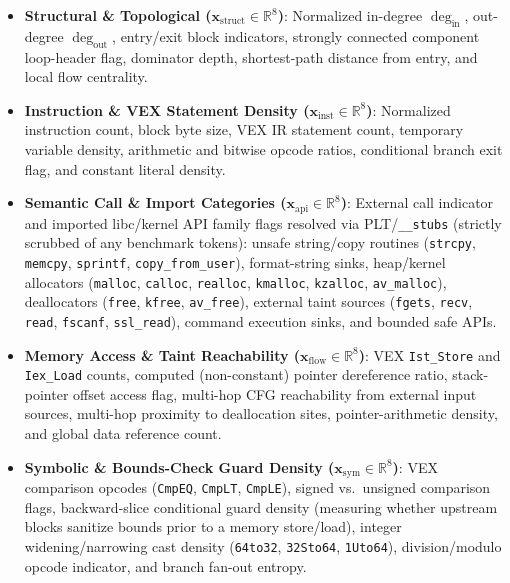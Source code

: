 \documentclass[10pt,conference]{IEEEtran}
\begin{document}
\begin{itemize}
  \item \textbf{Structural \& Topological ($\mathbf{x}_{\text{struct}} \in \mathbb{R}^8$)}: Normalized in-degree $\deg_{\text{in}}$, out-degree $\deg_{\text{out}}$, entry/exit block indicators, strongly connected component loop-header flag, dominator depth, shortest-path distance from entry, and local flow centrality.
  \item \textbf{Instruction \& VEX Statement Density ($\mathbf{x}_{\text{inst}} \in \mathbb{R}^8$)}: Normalized instruction count, block byte size, VEX IR statement count, temporary variable density, arithmetic and bitwise opcode ratios, conditional branch exit flag, and constant literal density.
  \item \textbf{Semantic Call \& Import Categories ($\mathbf{x}_{\text{api}} \in \mathbb{R}^8$)}: External call indicator and imported libc/kernel API family flags resolved via PLT/\texttt{\_\_stubs} (strictly scrubbed of any benchmark tokens): unsafe string/copy routines (\texttt{strcpy}, \texttt{memcpy}, \texttt{sprintf}, \texttt{copy\_from\_user}), format-string sinks, heap/kernel allocators (\texttt{malloc}, \texttt{calloc}, \texttt{realloc}, \texttt{kmalloc}, \texttt{kzalloc}, \texttt{av\_malloc}), deallocators (\texttt{free}, \texttt{kfree}, \texttt{av\_free}), external taint sources (\texttt{fgets}, \texttt{recv}, \texttt{read}, \texttt{fscanf}, \texttt{ssl\_read}), command execution sinks, and bounded safe APIs.
  \item \textbf{Memory Access \& Taint Reachability ($\mathbf{x}_{\text{flow}} \in \mathbb{R}^8$)}: VEX \texttt{Ist\_Store} and \texttt{Iex\_Load} counts, computed (non-constant) pointer dereference ratio, stack-pointer offset access flag, multi-hop CFG reachability from external input sources, multi-hop proximity to deallocation sites, pointer-arithmetic density, and global data reference count.
  \item \textbf{Symbolic \& Bounds-Check Guard Density ($\mathbf{x}_{\text{sym}} \in \mathbb{R}^8$)}: VEX comparison opcodes (\texttt{CmpEQ}, \texttt{CmpLT}, \texttt{CmpLE}), signed vs.\ unsigned comparison flags, backward-slice conditional guard density (measuring whether upstream blocks sanitize bounds prior to a memory store/load), integer widening/narrowing cast density (\texttt{64to32}, \texttt{32Sto64}, \texttt{1Uto64}), division/modulo opcode indicator, and branch fan-out entropy.
\end{itemize}
\end{document}
